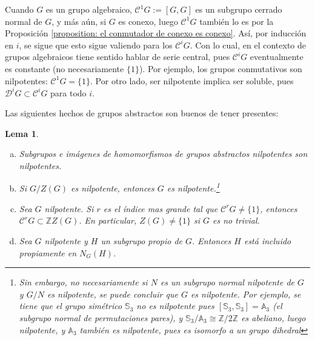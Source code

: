 \documentclass[spanish,10pt]{amsart}
\newtheorem{lemma}[theorem]{Lema}
\theoremstyle{definition}
\theoremstyle{remark}
\numberwithin{equation}{section}
\newcommand{\integers}{\mathbb{Z}}
\begin{document}
Cuando $G$ es un grupo algebraico, $\mathcal C^1 G := [G,G]$ es un subgrupo cerrado normal de $G$, y más aún, si $G$ es conexo, luego $\mathcal C^1 G$ también lo es por la Proposición \ref{proposition: el conmutador de conexo es conexo}. Así, por inducción en $i$, se sigue que esto sigue valiendo para los $\mathcal C^i G$. Con lo cual, en el contexto de grupos algebraicos tiene sentido hablar de serie central, pues $\mathcal C^i G$ eventualmente es constante (no necesariamente $\{1\}$). Por ejemplo, los grupos conmutativos son nilpotentes: $\mathcal C^1 G = \{1\}$. Por otro lado, ser nilpotente implica ser soluble, pues $\mathcal D^i G \subset \mathcal C^i G$ para todo $i$.

Las siguientes hechos de grupos abstractos son buenos de tener presentes:
\begin{lemma}
\begin{enumerate}[(a)]
\item Subgrupos e imágenes de homomorfismos de grupos abstractos nilpotentes son nilpotentes.
\item Si $G/Z(G)$ es nilpotente, entonces $G$ es nilpotente.\footnote{Sin embargo, no necesariamente si $N$ es un subgrupo normal nilpotente de $G$ y $G/N$ es nilpotente, se puede concluir que $G$ es nilpotente. Por ejemplo, se tiene que el grupo simétrico $\mathbb{S}_3$ no es nilpotente pues $[\mathbb{S}_3, \mathbb{S}_3] = \mathbb A_3$ (el subgrupo normal de permutaciones pares), y $\mathbb{S}_3 / \mathbb{A}_3 \cong \integers /2 \integers$ es abeliano, luego nilpotente, y $\mathbb{A}_3$ también es nilpotente, pues es isomorfo a un grupo dihedral}
\item Sea $G$ nilpotente. Si $r$ es el índice mas grande tal que $\mathcal C^r G \neq \{1\}$, entonces $\mathcal C^r G \subset \integers Z(G)$. En particular, $Z(G) \neq \{1\}$ si $G$ es no trivial.
\item Sea $G$ nilpotente y $H$ un subgrupo propio de $G$. Entonces $H$ está incluido propiamente en $N_G (H)$.
\end{enumerate}
\end{lemma}
\end{document}
